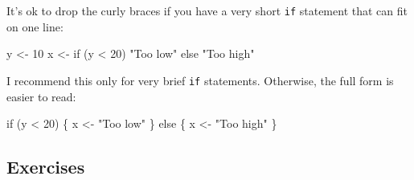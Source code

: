 \documentclass[]{book}
\newenvironment{Shaded}{\begin{snugshade}}{\end{snugshade}}
\newcommand{\DecValTok}[1]{\textcolor[rgb]{0.00,0.00,0.81}{{#1}}}
\newcommand{\StringTok}[1]{\textcolor[rgb]{0.31,0.60,0.02}{{#1}}}
\newcommand{\NormalTok}[1]{{#1}}
\begin{document}
It's ok to drop the curly braces if you have a very short \texttt{if}
statement that can fit on one line:

\begin{Shaded}
\begin{Highlighting}[]
\NormalTok{y <-}\StringTok{ }\DecValTok{10}
\NormalTok{x <-}\StringTok{ }\NormalTok{if (y <}\StringTok{ }\DecValTok{20}\NormalTok{) }\StringTok{"Too low"} \NormalTok{else }\StringTok{"Too high"}
\end{Highlighting}
\end{Shaded}

I recommend this only for very brief \texttt{if} statements. Otherwise,
the full form is easier to read:

\begin{Shaded}
\begin{Highlighting}[]
\NormalTok{if (y <}\StringTok{ }\DecValTok{20}\NormalTok{) \{}
  \NormalTok{x <-}\StringTok{ "Too low"} 
\NormalTok{\} else \{}
  \NormalTok{x <-}\StringTok{ "Too high"}
\NormalTok{\}}
\end{Highlighting}
\end{Shaded}

\subsection{Exercises}\label{exercises-49}
\end{document}

